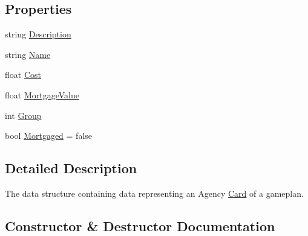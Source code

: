 \subsection*{Properties}
\begin{DoxyCompactItemize}
\item 
string \mbox{\hyperlink{class_monopoly_1_1_cards_1_1_agency_card_a5138a452ca504b2073eb739eca1e9abe}{Description}}
\item 
string \mbox{\hyperlink{class_monopoly_1_1_cards_1_1_card_ac114f0ec54d1b86154e9c596c3980003}{Name}}
\item 
float \mbox{\hyperlink{class_monopoly_1_1_cards_1_1_card_a67df91aa53596b2ce61ef2c3386ddd7c}{Cost}}
\item 
float \mbox{\hyperlink{class_monopoly_1_1_cards_1_1_card_adb2af81dda38706437f368b088c9b1a6}{Mortgage\+Value}}
\item 
int \mbox{\hyperlink{class_monopoly_1_1_cards_1_1_card_a90d55a4790f3d8afeba0203b70fa2086}{Group}}
\item 
bool \mbox{\hyperlink{class_monopoly_1_1_cards_1_1_card_a5569d582a0692b3a37c81dd2320cc367}{Mortgaged}} = false
\end{DoxyCompactItemize}


\subsection{Detailed Description}
The data structure containing data representing an Agency \mbox{\hyperlink{class_monopoly_1_1_cards_1_1_card}{Card}} of a gameplan. 

\subsection{Constructor \& Destructor Documentation}
\mbox{\label{class_monopoly_1_1_cards_1_1_agency_card_ac328333ee5f6dc5b7e0903af22aff615}} 
